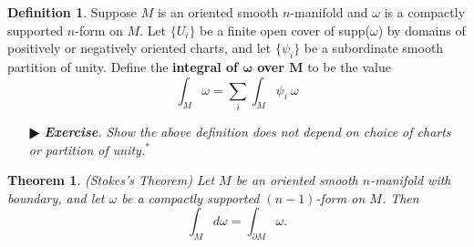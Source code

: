 \documentclass[11pt]{amsart}
\newtheorem*{theorem*}{Theorem}
\theoremstyle{definition}
\newtheorem*{definition*}{Definition}
\renewcommand\:{\colon}
\newcommand{\1}{\mathds{1}}
\newcommand{\exc}[1]{\vspace{-2.5pt}\begin{itemize}[leftmargin=15pt]\item[$\RHD$] \textit{\textbf{Exercise}. #1}\end{itemize}}
\begin{document}
\begin{definition*}
	Suppose $M$ is an oriented smooth $n$-manifold and $\omega$ is a compactly supported $n$-form on $M$. Let $\{U_i\}$ be a finite open cover of supp($\omega$) by domains of positively or negatively oriented charts, and let $\{\psi_i\}$ be a subordinate smooth partition of unity. Define the \textbf{integral of $\boldsymbol{\omega}$ over $\boldsymbol{M}$} to be the value
		\[ \int_M \omega = \sum_i \int_M \psi_i \ \omega \]
\end{definition*}

\exc{Show the above definition does not depend on choice of charts or partition of unity.$^*$}

\begin{theorem*}
	\textnormal{(Stokes's Theorem)} Let $M$ be an oriented smooth $n$-manifold with boundary, and let $\omega$ be a compactly supported $(n-1)$-form on $M$. Then
		\[ \int_M d\omega = \int_{\partial M} \omega. \]
\end{theorem*}
\end{document}
